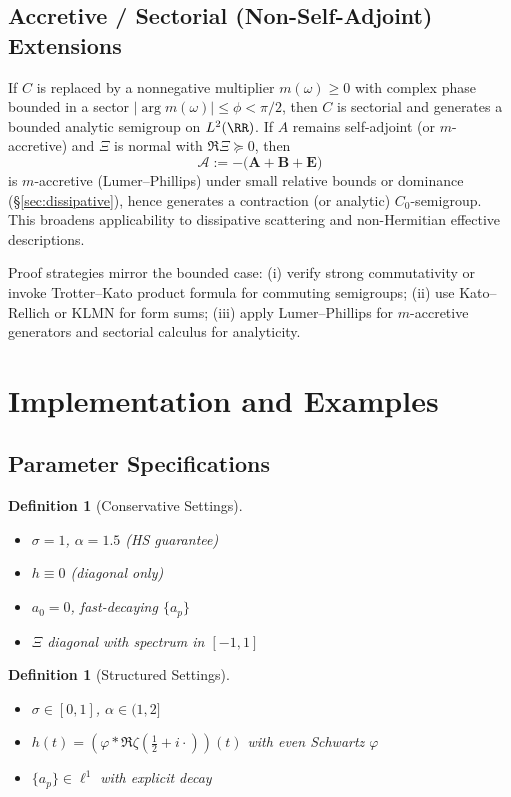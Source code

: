 \documentclass[12]{amsart}
\theoremstyle{plain}
\newtheorem{definition}[theorem]{Definition}
\begin{document}
\subsection{Accretive / Sectorial (Non-Self-Adjoint) Extensions}
If $C$ is replaced by a nonnegative multiplier $m(\omega)\ge 0$ with complex phase bounded in a sector 
$|\arg m(\omega)|\le \phi<\pi/2$, then $C$ is sectorial and generates a bounded analytic semigroup on $L^2(\RR)$.
If $A$ remains self-adjoint (or $m$-accretive) and $\Xi$ is normal with $\Re \Xi \succeq 0$, then
\[
\mathcal A := -\big(\mathbf A+\mathbf B+\mathbf E\big)
\]
is $m$-accretive (Lumer–Phillips) under small relative bounds or dominance (\S\ref{sec:dissipative}), hence generates a contraction (or analytic) $C_0$-semigroup.
This broadens applicability to dissipative scattering and non-Hermitian effective descriptions.

\begin{remark}
Proof strategies mirror the bounded case: (i) verify strong commutativity or invoke Trotter–Kato product formula for commuting semigroups; 
(ii) use Kato–Rellich or KLMN for form sums; 
(iii) apply Lumer–Phillips for $m$-accretive generators and sectorial calculus for analyticity.
\end{remark}

\section{Implementation and Examples}

\subsection{Parameter Specifications}

\begin{definition}[Conservative Settings]
\begin{itemize}
    \item $\sigma = 1$, $\alpha = 1.5$ (HS guarantee)
    \item $h \equiv 0$ (diagonal only)
    \item $a_0 = 0$, fast-decaying $\{a_p\}$
    \item $\Xi$ diagonal with spectrum in $[-1,1]$
\end{itemize}
\end{definition}

\begin{definition}[Structured Settings] 
\begin{itemize}
    \item $\sigma \in [0,1]$, $\alpha \in (1,2]$
    \item $h(t) = (\varphi * \Re\zeta(\frac12 + i\cdot))(t)$ with even Schwartz $\varphi$
    \item $\{a_p\} \in \ell^1$ with explicit decay
\end{itemize}
\end{definition}
\end{document}
